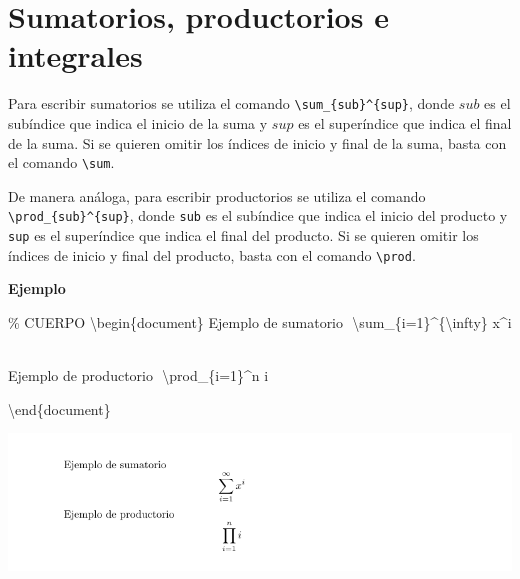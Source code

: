 \documentclass[
  letterpaper,
  DIV=11,
  numbers=noendperiod]{scrreport}
\newenvironment{Shaded}{\begin{snugshade}}{\end{snugshade}}
\newcommand{\CommentTok}[1]{\textcolor[rgb]{0.37,0.37,0.37}{#1}}
\newcommand{\ExtensionTok}[1]{\textcolor[rgb]{0.00,0.23,0.31}{#1}}
\newcommand{\KeywordTok}[1]{\textcolor[rgb]{0.00,0.23,0.31}{#1}}
\newcommand{\NormalTok}[1]{\textcolor[rgb]{0.00,0.23,0.31}{#1}}
\newcommand{\SpecialCharTok}[1]{\textcolor[rgb]{0.37,0.37,0.37}{#1}}
\newcommand{\SpecialStringTok}[1]{\textcolor[rgb]{0.13,0.47,0.30}{#1}}
\begin{document}
\hypertarget{sumatorios-productorios-e-integrales}{%
\section{Sumatorios, productorios e
integrales}\label{sumatorios-productorios-e-integrales}}

Para escribir sumatorios se utiliza el comando
\texttt{\textbackslash{}sum\_\{sub\}\^{}\{sup\}}, donde \(sub\) es el
subíndice que indica el inicio de la suma y \(sup\) es el superíndice
que indica el final de la suma. Si se quieren omitir los índices de
inicio y final de la suma, basta con el comando
\texttt{\textbackslash{}sum}.

De manera análoga, para escribir productorios se utiliza el comando
\texttt{\textbackslash{}prod\_\{sub\}\^{}\{sup\}}, donde \texttt{sub} es
el subíndice que indica el inicio del producto y \texttt{sup} es el
superíndice que indica el final del producto. Si se quieren omitir los
índices de inicio y final del producto, basta con el comando
\texttt{\textbackslash{}prod}.

\textbf{Ejemplo}

\begin{Shaded}
\begin{Highlighting}[]
\CommentTok{\% CUERPO}
\KeywordTok{\textbackslash{}begin}\NormalTok{\{}\ExtensionTok{document}\NormalTok{\}}
\NormalTok{Ejemplo de sumatorio}
\SpecialStringTok{$$}
\SpecialCharTok{\textbackslash{}sum}\SpecialStringTok{\_\{i=1\}\^{}\{}\SpecialCharTok{\textbackslash{}infty}\SpecialStringTok{\} x\^{}i}
\SpecialStringTok{$$}




\NormalTok{Ejemplo de productorio}
\SpecialStringTok{$$}
\SpecialCharTok{\textbackslash{}prod}\SpecialStringTok{\_\{i=1\}\^{}n i}
\SpecialStringTok{$$}



\KeywordTok{\textbackslash{}end}\NormalTok{\{}\ExtensionTok{document}\NormalTok{\}}
\end{Highlighting}
\end{Shaded}

\begin{tcolorbox}[enhanced jigsaw, arc=.35mm, toprule=.15mm, opacitybacktitle=0.6, colback=white, coltitle=black, colbacktitle=quarto-callout-note-color!10!white, breakable, colframe=quarto-callout-note-color-frame, left=2mm, opacityback=0, bottomtitle=1mm, toptitle=1mm, titlerule=0mm, title={Salida}, bottomrule=.15mm, leftrule=.75mm, rightrule=.15mm]
\includegraphics{./img/formulas/sumatorio.png}
\end{tcolorbox}
\end{document}
